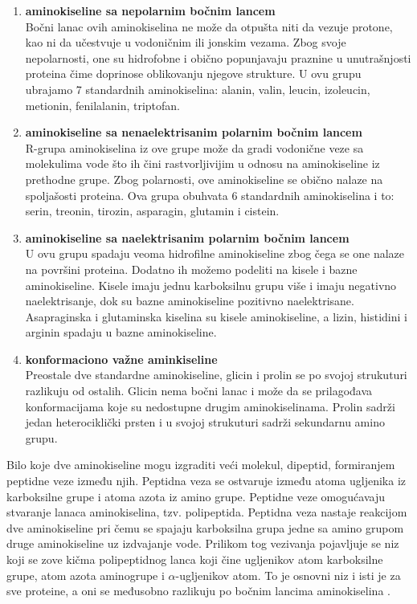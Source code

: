 \begin{enumerate}
	\item \textbf{aminokiseline sa nepolarnim bočnim lancem}\\
	Bočni lanac ovih aminokiselina ne može da otpušta niti da vezuje protone, kao ni da učestvuje u vodoničnim ili jonskim vezama. Zbog svoje nepolarnosti, one su hidrofobne i obično popunjavaju praznine u unutrašnjosti proteina čime doprinose oblikovanju njegove strukture. U ovu grupu ubrajamo 7 standardnih aminokiselina: alanin, valin, leucin, izoleucin, metionin, fenilalanin, triptofan. 
	
	\item \textbf{aminokiseline sa nenaelektrisanim polarnim bočnim lancem}\\
	R-grupa aminokiselina iz ove grupe može da gradi vodonične veze sa molekulima vode što ih čini rastvorljivijim u odnosu na aminokiseline iz prethodne grupe. Zbog polarnosti, ove aminokiseline se obično nalaze na spoljašosti proteina. Ova grupa obuhvata 6 standardnih aminokiselina i to: serin, treonin, tirozin, asparagin, glutamin i cistein. 
	
	\item \textbf{aminokiseline sa naelektrisanim polarnim bočnim lancem}\\
	U ovu grupu spadaju veoma hidrofilne aminokiseline zbog čega se one nalaze na površini proteina. Dodatno ih možemo podeliti na kisele i bazne aminokiseline. Kisele imaju jednu karboksilnu grupu više i imaju negativno naelektrisanje, dok su bazne aminokiseline pozitivno naelektrisane. Asapraginska i glutaminska kiselina su kisele aminokiseline, a lizin, histidini i arginin spadaju u bazne aminokiseline.  
	
	\item \textbf{konformaciono važne aminkiseline}\\
	Preostale dve standardne aminokiseline, glicin i prolin se po svojoj strukuturi razlikuju od ostalih. Glicin nema bočni lanac i može da se prilagođava konformacijama koje su nedostupne drugim aminokiselinama. Prolin sadrži jedan heterociklički prsten i u svojoj strukuturi sadrži sekundarnu amino grupu. 
\end{enumerate}



Bilo koje dve aminokiseline mogu izgraditi veći molekul, dipeptid, formiranjem peptidne veze između njih. Peptidna veza se ostvaruje između atoma ugljenika iz karboksilne grupe i atoma azota iz amino grupe. Peptidne veze omogućavaju stvaranje lanaca aminokiselina, tzv. polipeptida. Peptidna veza nastaje reakcijom dve aminokiseline pri čemu se spajaju karboksilna grupa jedne sa amino grupom druge aminokiseline uz izdvajanje vode. Prilikom tog vezivanja pojavljuje se niz koji se zove kičma polipeptidnog lanca koji čine ugljenikov atom karboksilne grupe, atom azota aminogrupe i $\alpha$-ugljenikov atom. To je osnovni niz i isti je za sve proteine, a oni se međusobno razlikuju po bočnim lancima aminokiselina \cite{biohUdz, bioinf}.


